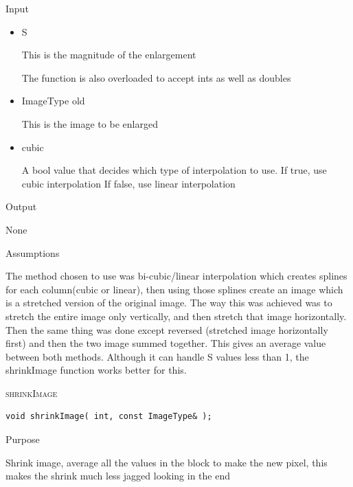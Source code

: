 \documentclass[pdftex, 11pt]{article}
\begin{document}
\begin{description}
\begin{description}
			\item{Input}

				\begin{itemize}

					\item{S}

						This is the magnitude of the enlargement

						The function is also overloaded 
						to accept ints as well as doubles

					\item{ImageType old}

						This is the image to be enlarged

					\item{cubic}

						A bool value that decides which type of
						interpolation to use.
						If true, use cubic interpolation
						If false, use linear interpolation
				\end{itemize}

			\item{Output}

				None

			\item{Assumptions}


				The method chosen to use was bi-cubic/linear
				interpolation which creates
				splines for each column(cubic or linear),
				then using those splines create an
				image which is a stretched version of the original 
				image.  The way this was achieved
				was to stretch the entire image only vertically,
				and then stretch that
				image horizontally.  Then the same thing was done except
				reversed (stretched image
				horizontally first) and then the two image summed 
				together.  This gives an
				average value between both methods.  Although it can
				handle S values less
				than 1, the shrinkImage function works better for this.

		\end{description}

	\item{\textsc{shrinkImage}}
		\begin{description}

\begin{lstlisting}
void shrinkImage( int, const ImageType& );
\end{lstlisting}

			\item{Purpose}

				Shrink image, average all the values
				in the block to make the new pixel, this
				makes the shrink much less jagged looking in the end


\end{description}
\end{description}
\end{document}

